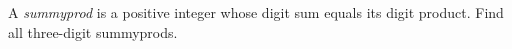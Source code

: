 A \emph{summyprod} is a positive integer whose digit sum equals its digit product. Find all three-digit summyprods.
